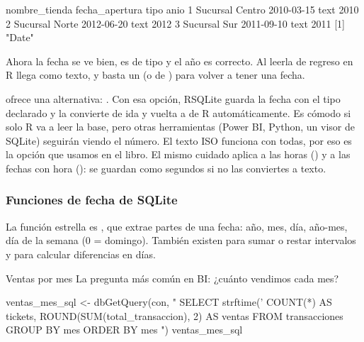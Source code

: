 \begin{rsalida}
    nombre_tienda fecha_apertura tipo anio
1 Sucursal Centro     2010-03-15 text 2010
2  Sucursal Norte     2012-06-20 text 2012
3    Sucursal Sur     2011-09-10 text 2011
[1] "Date"
\end{rsalida}

Ahora la fecha se ve bien, es de tipo  y el año es correcto.
Al leerla de regreso en R llega como texto, y basta un 
(o  de ) para volver a tener una fecha.

\begin{consejo}
 ofrece una alternativa:
. Con esa
opción, RSQLite guarda la fecha con el tipo declarado  y la
convierte de ida y vuelta a  de R automáticamente. Es cómodo si
solo R va a leer la base, pero otras herramientas (Power BI, Python, un
visor de SQLite) seguirán viendo el número. El texto ISO funciona con
todas, por eso es la opción que usamos en el libro. El mismo cuidado aplica
a las horas () y a las fechas con hora (): se
guardan como segundos si no las conviertes a texto.
\end{consejo}

\subsubsection{Funciones de fecha de SQLite}

La función estrella es , que extrae partes
de una fecha:  año,  mes,  día,
 año-mes,  día de la semana
(0 = domingo). También existen  para sumar o restar
intervalos y  para calcular diferencias en días.

\begin{ejemplo}{Ventas por mes}
La pregunta más común en BI: ¿cuánto vendimos cada mes?
\end{ejemplo}

\begin{rcode}
ventas_mes_sql <- dbGetQuery(con, "
  SELECT strftime('%
         COUNT(*)                         AS tickets,
         ROUND(SUM(total_transaccion), 2) AS ventas
  FROM transacciones
  GROUP BY mes
  ORDER BY mes
")
ventas_mes_sql
\end{rcode}

